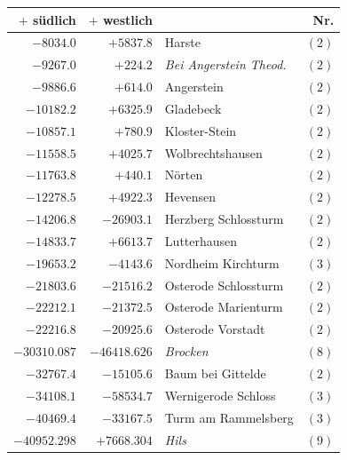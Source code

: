 \begin{center}\begingroup\fontsize{8}{9}\selectfont
\setlength{\tabcolsep}{4pt}
\begin{tabular}{r|r|p{170pt}|r}\hline
\(+\) südlich&\(+\) westlich&&Nr.\\\hline
\(-8034.0\)&\(+5837.8\)&Harste&\((2)\)\\
\(-9267.0\)&\(+224.2\)&\textit{Bei Angerstein Theod.}&\((2)\)\\
\(-9886.6\)&\(+614.0\)&Angerstein&\((2)\)\\
\(-10182.2\)&\(+6325.9\)&Gladebeck&\((2)\)\\
\(-10857.1\)&\(+780.9\)&Kloster-Stein&\((2)\)\\
\(-11558.5\)&\(+4025.7\)&Wolbrechtshausen&\((2)\)\\
\(-11763.8\)&\(+440.1\)&Nörten&\((2)\)\\
\(-12278.5\)&\(+4922.3\)&Hevensen&\((2)\)\\
\(-14206.8\)&\(-26903.1\)&Herzberg Schlossturm&\((2)\)\\
\(-14833.7\)&\(+6613.7\)&Lutterhausen&\((2)\)\\
\(-19653.2\)&\(-4143.6\)&Nordheim Kirchturm&\((3)\)\\
\(-21803.6\)&\(-21516.2\)&Osterode Schlossturm&\((2)\)\\
\(-22212.1\)&\(-21372.5\)&Osterode Marienturm&\((2)\)\\
\(-22216.8\)&\(-20925.6\)&Osterode Vorstadt&\((2)\)\\
\(-30310.087\)&\(-46418.626\)&\textit{Brocken}&\((8)\)\\
\(-32767.4\)&\(-15105.6\)&Baum bei Gittelde&\((2)\)\\
\(-34108.1\)&\(-58534.7\)&Wernigerode Schloss&\((3)\)\\
\(-40469.4\)&\(-33167.5\)&Turm am Rammelsberg&\((3)\)\\
\(-40952.298\)&\(+7668.304\)&\textit{Hils}&\((9)\)\\
\hline\end{tabular}\endgroup\end{center}

